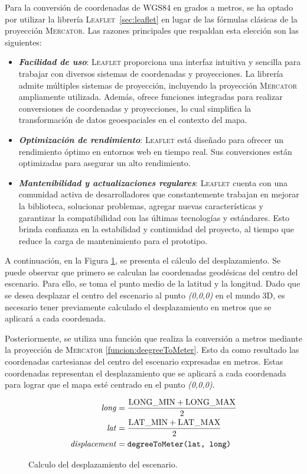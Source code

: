 \documentclass[a4paper, 11pt]{book}
\begin{document}
Para la conversión de coordenadas de \textsc{WGS84} en grados a metros, se ha optado por utilizar la librería \textsc{Leaflet}~\ref{sec:leaflet} en lugar de las fórmulas clásicas de la proyección \textsc{Mercator}. Las razones principales que respaldan esta elección son las siguientes:
\begin{itemize}
    \item \textbf{\emph{Facilidad de uso}}: \textsc{Leaflet} proporciona una interfaz intuitiva y sencilla para trabajar con diversos sistemas de coordenadas y proyecciones. La librería admite múltiples sistemas de proyección, incluyendo la proyección \textsc{Mercator} ampliamente utilizada. 
    Además, ofrece funciones integradas para realizar conversiones de coordenadas y proyecciones, lo cual simplifica la transformación de datos geoespaciales en el contexto del mapa.
    \item \textbf{\emph{Optimización de rendimiento}}: \textsc{Leaflet} está diseñado para ofrecer un rendimiento óptimo en entornos web en tiempo real. Sus conversiones están optimizadas para asegurar un alto rendimiento.
    \item \textbf{\emph{Mantenibilidad y actualizaciones regulares}}: \textsc{Leaflet} cuenta con una comunidad activa de desarrolladores que constantemente trabajan en mejorar la biblioteca, solucionar problemas, agregar nuevas características y garantizar la compatibilidad con las últimas tecnologías y estándares. Esto brinda confianza en la estabilidad y continuidad del proyecto, al tiempo que reduce la carga de mantenimiento para el prototipo.
\end{itemize}
A continuación, en la Figura \ref{formula:desplazamiento}, se presenta el cálculo del desplazamiento. Se puede observar que primero se calculan las coordenadas geodésicas del centro del escenario. Para ello, se toma el punto medio de la latitud y la longitud. Dado que se desea desplazar el centro del escenario al punto \emph{(0,0,0)} en el mundo \textsc{3D}, es necesario tener previamente calculado el desplazamiento en metros que se aplicará a cada coordenada.

Posteriormente, se utiliza una función que realiza la conversión a metros mediante la proyección de \textsc{Mercator} \ref{funcion:deegreeToMeter}. Esto da como resultado las coordenadas cartesianas del centro del escenario expresadas en metros. Estas coordenadas representan el desplazamiento que se aplicará a cada coordenada para lograr que el mapa esté centrado en el punto \emph{(0,0,0)}.
\begin{figure}[h]
\begin{align*}
\text{\emph{long}} &= \frac{{\text{LONG\_MIN} + \text{LONG\_MAX}}}{2} \\
\text{\emph{lat}} &= \frac{{\text{LAT\_MIN} + \text{LAT\_MAX}}}{2} \\
\text{\emph{displacement}} &= \texttt{\text{degreeToMeter}(\text{lat}, \text{long})}
\end{align*}
\caption{Calculo del desplazamiento del escenario.}
  \label{formula:desplazamiento}
\end{figure}
\end{document}
